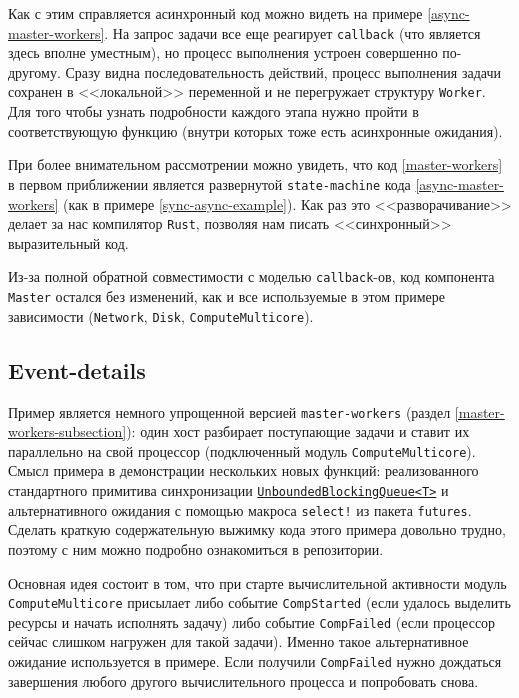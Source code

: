 Как с этим справляется асинхронный код можно видеть на примере \ref{async-master-workers}. На запрос задачи все еще реагирует \texttt{callback} (что является здесь вполне уместным), но процесс выполнения устроен совершенно по-другому. Сразу видна последовательность действий, процесс выполнения задачи сохранен в <<локальной>> переменной и не перегружает структуру \texttt{Worker}. Для того чтобы узнать подробности каждого этапа нужно пройти в соответствующую функцию (внутри которых тоже есть асинхронные ожидания). 

При более внимательном рассмотрении можно увидеть, что код \ref{master-workers} в первом приближении является развернутой \texttt{state-machine} кода \ref{async-master-workers} (как в примере \ref{sync-async-example}). Как раз это <<разворачивание>> делает за нас компилятор \texttt{Rust}, позволяя нам писать <<синхронный>> выразительный код.

Из-за полной обратной совместимости с моделью \texttt{callback}-ов, код компонента \texttt{Master} остался без изменений, как и все используемые в этом примере зависимости (\texttt{Network}, \texttt{Disk}, \texttt{ComputeMulticore}).

\subsection{Event-details}
Пример является немного упрощенной версией \texttt{master-workers} (раздел \ref{master-workers-subsection}): один хост разбирает поступающие задачи и ставит их параллельно на свой процессор (подключенный модуль \texttt{ComputeMulticore}). Смысл примера в демонстрации нескольких новых функций: реализованного стандартного примитива синхронизации \hyperref[blockingqueue]{\texttt{UnboundedBlockingQueue<T>}} и альтернативного ожидания с помощью макроса \texttt{select!} из пакета \texttt{futures}. Сделать краткую содержательную выжимку кода этого примера довольно трудно, поэтому с ним можно подробно ознакомиться в репозитории\cite{async-event-details-example}.

Основная идея состоит в том, что при старте вычислительной активности модуль \texttt{ComputeMulticore} присылает либо событие \texttt{CompStarted} (если удалось выделить ресурсы и начать исполнять задачу) либо событие \texttt{CompFailed} (если процессор сейчас слишком нагружен для такой задачи). Именно такое альтернативное ожидание используется в примере. Если получили \texttt{CompFailed} нужно дождаться завершения любого другого вычислительного процесса и попробовать снова. 

